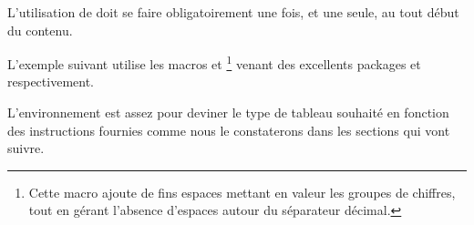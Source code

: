 \documentclass[10pt, a4paper]{article}
\begin{document}
\begin{tdocwarn}
	L'utilisation de  doit se faire obligatoirement une fois, et une seule, au tout début du contenu.
\end{tdocwarn}




\begin{tdocexa}
    \leavevmode

\end{tdocexa}



\begin{tdocexa}
%
    L'exemple suivant utilise les macros  et 
    \footnote{
    	Cette macro ajoute de fins espaces mettant en valeur les groupes de chiffres, tout en gérant l'absence d'espaces autour du séparateur décimal.
    }
    venant des excellents packages  et  respectivement.

\end{tdocexa}




\begin{tdocexa}
    \leavevmode

\end{tdocexa}




\begin{tdocnote}
	L'environnement  est assez  pour deviner le type de tableau souhaité en fonction des instructions fournies comme nous le constaterons dans les sections qui vont suivre.
\end{tdocnote}
\end{document}
